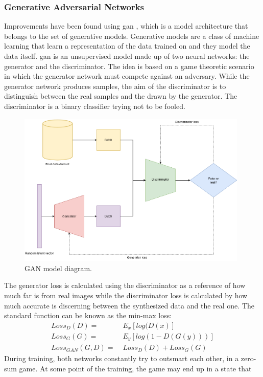\documentclass[11pt, a4paper]{article}
\begin{document}
	\subsubsection{Generative Adversarial Networks}
	Improvements have been found using \gls{gan} \cite{goodfellow2014generative}, which is a model architecture that belongs to the set of generative models. Generative models are a class of machine learning that learn a representation of the data trained on and they model the data itself. \gls{gan} is an unsupervised model made up of two neural networks: the generator and the discriminator. The idea is based on a game theoretic scenario in which the generator network must compete against an adversary. While the generator network produces samples, the aim of the discriminator is to distinguish between the real samples and the drawn by the generator. The discriminator is a binary classifier trying not to be fooled. 
	\begin{figure}[H]
		\centering
		\includegraphics[width=11cm]{imgs/relatedwork/gan.png}
		\caption{GAN model diagram.}
		\label{fig:related-gan-diagram}
	\end{figure}
	The generator loss is calculated using the discriminator as a reference of how much far is from real images while the discriminator loss is calculated by how much accurate is discerning between the synthesized data and the real one. The standard function can be known as the min-max loss:
	\begin{align*}
		Loss_D(D) =& \; E_x[log(D(x)]\\
		Loss_G(G) =& \; E_y[log(1 - D(G(y)))]\\
		Loss_{GAN}(G, D) =&\; Loss_D(D) + Loss_G(G)
	\end{align*}
	During training, both networks constantly try to outsmart each
	other, in a zero-sum game. At some point of the training, the game may end up in a state that
\end{document}
